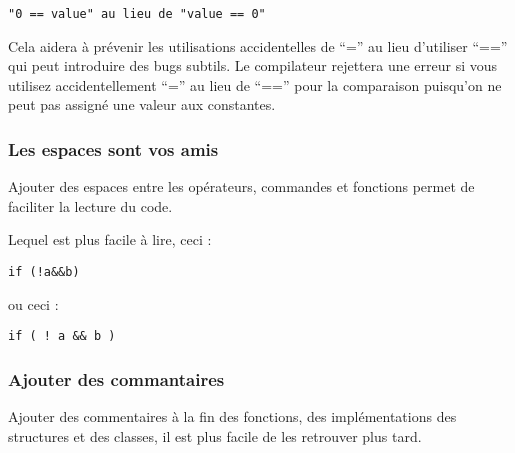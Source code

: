 \begin{verbatim}
"0 == value" au lieu de "value == 0"
\end{verbatim}

Cela aidera à prévenir les utilisations accidentelles de ``='' au lieu d'utiliser ``=='' qui peut introduire des bugs subtils. Le compilateur rejettera une erreur si vous utilisez accidentellement ``='' au lieu de ``=='' pour la comparaison puisqu'on ne peut pas assigné une valeur aux constantes.

\subsubsection{Les espaces sont vos amis}
Ajouter des espaces entre les opérateurs, commandes et fonctions permet de faciliter la lecture du code.

Lequel est plus facile à lire, ceci :

\begin{verbatim}
if (!a&&b)
\end{verbatim}

ou ceci :

\begin{verbatim}
if ( ! a && b )
\end{verbatim}

\subsubsection{Ajouter des commantaires}
Ajouter des commentaires à la fin des fonctions, des implémentations des structures et des classes, il est plus facile de les retrouver plus tard.

